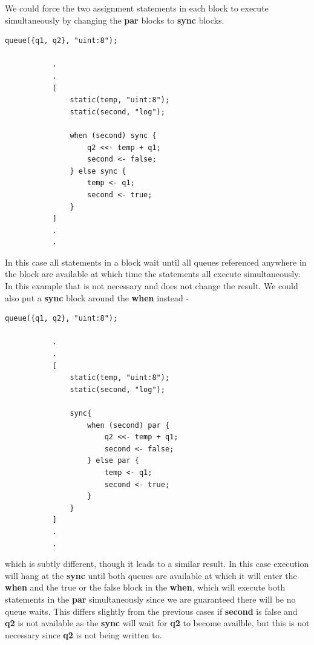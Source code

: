         We could force the two assignment statements in each
        block to execute simultaneously by changing the {\bf par}
        blocks to {\bf sync} blocks.
        \begin{lstlisting}[gobble=8, language=threepl]
           queue({q1, q2}, "uint:8");

           .
           .
           [
               static(temp, "uint:8");
               static(second, "log");

               when (second) sync {
                   q2 <<- temp + q1;
                   second <- false;
               } else sync {
                   temp <- q1;
                   second <- true;
               }
           ]
           .
           .
        \end{lstlisting}
        In this case all statements in a block wait until all
        queues referenced anywhere in the block are available at
        which time the statements all execute simultaneously. In
        this example that is not necessary and does not change
        the result. We could also put a {\bf sync} block around the
        {\bf when} instead -
        \begin{lstlisting}[gobble=8, language=threepl]
           queue({q1, q2}, "uint:8");

           .
           .
           [
               static(temp, "uint:8");
               static(second, "log");

               sync{
                   when (second) par {
                       q2 <<- temp + q1;
                       second <- false;
                   } else par {
                       temp <- q1;
                       second <- true;
                   }
               }
           ]
           .
           .
        \end{lstlisting}
        which is subtly different, though it leads to a similar result.
        In this case execution will hang at the {\bf sync} until both queues
        are available at which it will enter the {\bf when} and the true or
        the false block in the {\bf when}, which will execute both statements
        in the {\bf par} simultaneously since we are guaranteed there will be
        no queue waits. This differs slightly from the previous cases if
        {\bf second} is false and {\bf q2} is not available as the {\bf sync}
        will wait for {\bf q2} to become availble, but this is not necessary
        since {\bf q2} is not being written to.

